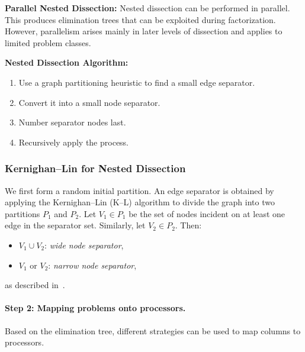 \documentclass[12pt]{book}
\begin{document}
\textbf{Parallel Nested Dissection:}  
Nested dissection can be performed in parallel.  
This produces elimination trees that can be exploited during factorization. However, parallelism arises mainly in later levels of dissection and applies to limited problem classes.

\textbf{Nested Dissection Algorithm:}
\begin{enumerate}
    \item Use a graph partitioning heuristic to find a small edge separator.
    \item Convert it into a small node separator.
    \item Number separator nodes last.
    \item Recursively apply the process.
\end{enumerate}


\subsubsection{Kernighan--Lin for Nested Dissection}
We first form a random initial partition. An edge separator is obtained by applying the Kernighan--Lin (K--L) algorithm to divide the graph into two partitions $P_1$ and $P_2$.  
Let $V_1 \in P_1$ be the set of nodes incident on at least one edge in the separator set. Similarly, let $V_2 \in P_2$.  
Then:
\begin{itemize}
    \item $V_1 \cup V_2$: \emph{wide node separator},  
    \item $V_1$ or $V_2$: \emph{narrow node separator},  
\end{itemize}
as described in~\cite{gilbert1987parallel}.

\paragraph{Step 2: Mapping problems onto processors.}  
Based on the elimination tree, different strategies can be used to map columns to processors.
\end{document}
